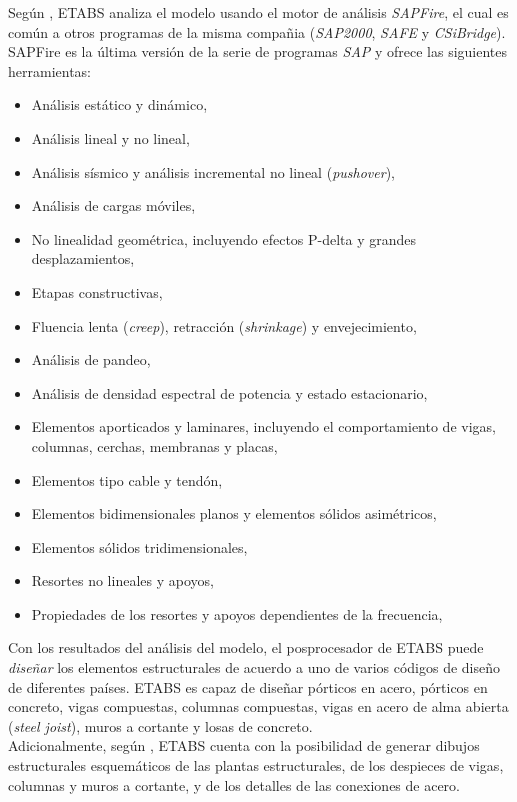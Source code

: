 Según \cite{ETABS2017analysisreferencemanual}, ETABS analiza el modelo usando el motor de análisis \emph{SAPFire}, el cual es común a otros programas de la misma compañia (\emph{SAP2000}, \emph{SAFE} y \emph{CSiBridge}). SAPFire es la última versión de la serie de programas \emph{SAP} y ofrece las siguientes herramientas:
\begin{itemize}
\item Análisis estático y dinámico,
\item Análisis lineal y no lineal,
\item Análisis sísmico y análisis incremental no lineal (\emph{pushover}),
\item Análisis de cargas móviles,
\item No linealidad geométrica, incluyendo efectos P-delta y grandes desplazamientos,
\item Etapas constructivas,
\item Fluencia lenta (\emph{creep}), retracción (\emph{shrinkage}) y envejecimiento,
\item Análisis de pandeo,
\item Análisis de densidad espectral de potencia y estado estacionario,
\item Elementos aporticados y laminares, incluyendo el comportamiento de vigas, columnas, cerchas, membranas y placas,
\item Elementos tipo cable y tendón,
\item Elementos bidimensionales planos y elementos sólidos asimétricos,
\item Elementos sólidos tridimensionales,
\item Resortes no lineales y apoyos,
\item Propiedades de los resortes y apoyos dependientes de la frecuencia,
\end{itemize}

Con los resultados del análisis del modelo, el posprocesador de ETABS puede \emph{diseñar} los elementos estructurales de acuerdo a uno de varios códigos de diseño de diferentes países. ETABS es capaz de diseñar pórticos en acero, pórticos en concreto, vigas compuestas, columnas compuestas, vigas en acero de alma abierta (\emph{steel joist}), muros a cortante y losas de concreto.\\

Adicionalmente, según \cite{ETABS2019welcome}, ETABS cuenta con la posibilidad de generar dibujos estructurales esquemáticos de las plantas estructurales, de los despieces de vigas, columnas y muros a cortante, y de los detalles de las conexiones de acero.\\

